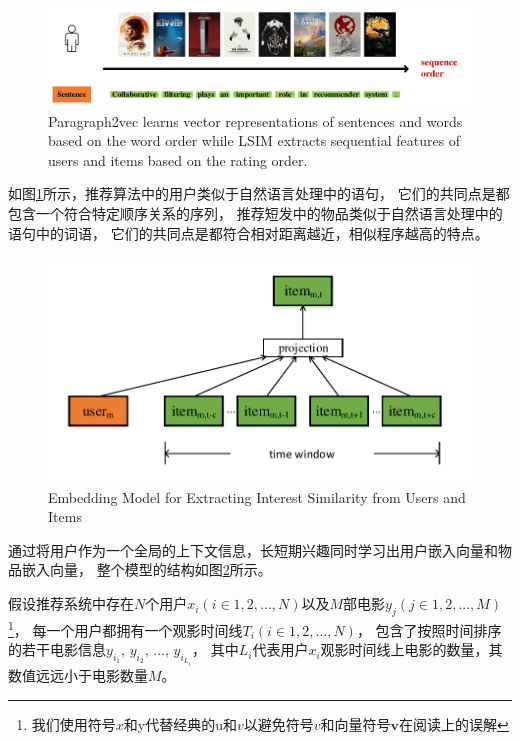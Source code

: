 \begin{figure}[htbp]
\centering
\includegraphics[scale=0.3]{images/example2.pdf}
\caption{Paragraph2vec learns vector representations of sentences and words
    based on the word order
    while LSIM extracts sequential features of users and items
    based on the rating order.
}
\label{fig:example2}
\end{figure}

如图\ref{fig:example2}所示，推荐算法中的用户类似于自然语言处理中的语句，
它们的共同点是都包含一个符合特定顺序关系的序列，
推荐短发中的物品类似于自然语言处理中的语句中的词语，
它们的共同点是都符合相对距离越近，相似程序越高的特点。

\begin{figure}[htbp]
    \centering
    \includegraphics[scale=0.6]{images/doc2vec.pdf}
    \caption{Embedding Model for Extracting Interest Similarity from Users and Items}
    \label{fig:doc2vec}
\end{figure}

通过将用户作为一个全局的上下文信息，长短期兴趣同时学习出用户嵌入向量和物品嵌入向量，
整个模型的结构如图\ref{fig:doc2vec}所示。

假设推荐系统中存在$N$个用户$x_i(i \in 1,2,...,N)$以及$M$部电影$y_j(j \in 1,2,...,M)$
\footnote{我们使用符号$x和$y$代替经典的$u和$v$以避免符号$v$和向量符号$\mathbf{v}$在阅读上的误解}，
每一个用户都拥有一个观影时间线$T_i(i \in 1,2,...,N)$，
包含了按照时间排序的若干电影信息$y_{i_1}$, $y_{i_2}$, ..., $y_{i_{L_i}}$，
其中$L_i$代表用户$x_i$观影时间线上电影的数量，其数值远远小于电影数量$M$。

